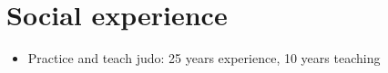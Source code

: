 \documentclass[11pt,a4paper,oneside,fleqn]{article}
\begin{document}
\section{Social experience}
\begin{itemize}
\item Practice and teach judo: 25 years experience, 10 years teaching 
\end{itemize}
\end{document}

